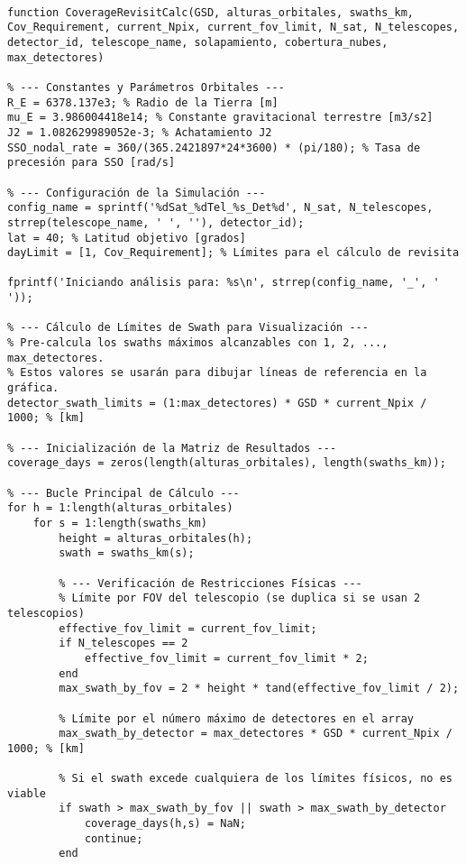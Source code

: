 \begin{verbatim}

function CoverageRevisitCalc(GSD, alturas_orbitales, swaths_km, Cov_Requirement, current_Npix, current_fov_limit, N_sat, N_telescopes, detector_id, telescope_name, solapamiento, cobertura_nubes, max_detectores)

% --- Constantes y Parámetros Orbitales ---
R_E = 6378.137e3; % Radio de la Tierra [m]
mu_E = 3.986004418e14; % Constante gravitacional terrestre [m3/s2]
J2 = 1.082629989052e-3; % Achatamiento J2
SSO_nodal_rate = 360/(365.2421897*24*3600) * (pi/180); % Tasa de precesión para SSO [rad/s]

% --- Configuración de la Simulación ---
config_name = sprintf('%dSat_%dTel_%s_Det%d', N_sat, N_telescopes, strrep(telescope_name, ' ', ''), detector_id);
lat = 40; % Latitud objetivo [grados]
dayLimit = [1, Cov_Requirement]; % Límites para el cálculo de revisita

fprintf('Iniciando análisis para: %s\n', strrep(config_name, '_', ' '));

% --- Cálculo de Límites de Swath para Visualización ---
% Pre-calcula los swaths máximos alcanzables con 1, 2, ..., max_detectores.
% Estos valores se usarán para dibujar líneas de referencia en la gráfica.
detector_swath_limits = (1:max_detectores) * GSD * current_Npix / 1000; % [km]

% --- Inicialización de la Matriz de Resultados ---
coverage_days = zeros(length(alturas_orbitales), length(swaths_km));

% --- Bucle Principal de Cálculo ---
for h = 1:length(alturas_orbitales)
    for s = 1:length(swaths_km)
        height = alturas_orbitales(h);
        swath = swaths_km(s);

        % --- Verificación de Restricciones Físicas ---
        % Límite por FOV del telescopio (se duplica si se usan 2 telescopios)
        effective_fov_limit = current_fov_limit;
        if N_telescopes == 2
            effective_fov_limit = current_fov_limit * 2;
        end
        max_swath_by_fov = 2 * height * tand(effective_fov_limit / 2);

        % Límite por el número máximo de detectores en el array
        max_swath_by_detector = max_detectores * GSD * current_Npix / 1000; % [km]

        % Si el swath excede cualquiera de los límites físicos, no es viable
        if swath > max_swath_by_fov || swath > max_swath_by_detector
            coverage_days(h,s) = NaN;
            continue;
        end


\end{verbatim}

